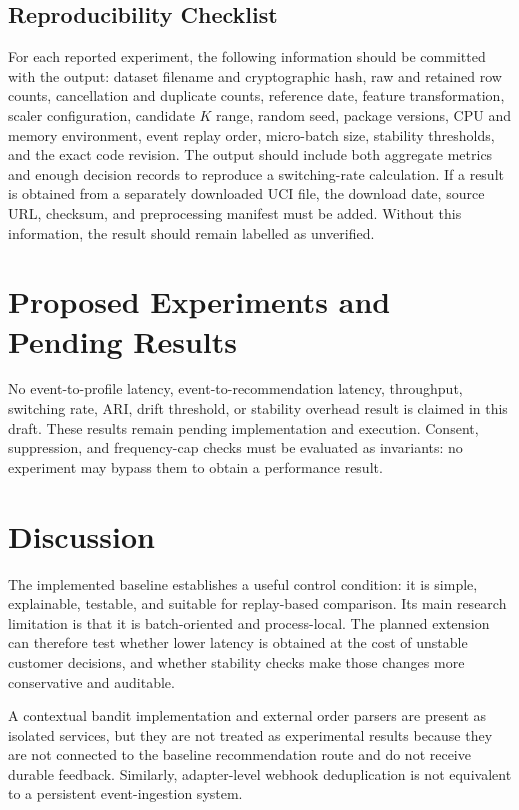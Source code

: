 \documentclass[conference]{IEEEtran}
\begin{document}
\subsection{Reproducibility Checklist}
For each reported experiment, the following information should be committed with the output: dataset filename and cryptographic hash, raw and retained row counts, cancellation and duplicate counts, reference date, feature transformation, scaler configuration, candidate $K$ range, random seed, package versions, CPU and memory environment, event replay order, micro-batch size, stability thresholds, and the exact code revision. The output should include both aggregate metrics and enough decision records to reproduce a switching-rate calculation. If a result is obtained from a separately downloaded UCI file, the download date, source URL, checksum, and preprocessing manifest must be added. Without this information, the result should remain labelled as unverified.

\section{Proposed Experiments and Pending Results}
No event-to-profile latency, event-to-recommendation latency, throughput, switching rate, ARI, drift threshold, or stability overhead result is claimed in this draft. These results remain pending implementation and execution. Consent, suppression, and frequency-cap checks must be evaluated as invariants: no experiment may bypass them to obtain a performance result.

\section{Discussion}
The implemented baseline establishes a useful control condition: it is simple, explainable, testable, and suitable for replay-based comparison. Its main research limitation is that it is batch-oriented and process-local. The planned extension can therefore test whether lower latency is obtained at the cost of unstable customer decisions, and whether stability checks make those changes more conservative and auditable.

A contextual bandit implementation and external order parsers are present as isolated services, but they are not treated as experimental results because they are not connected to the baseline recommendation route and do not receive durable feedback. Similarly, adapter-level webhook deduplication is not equivalent to a persistent event-ingestion system.
\end{document}
